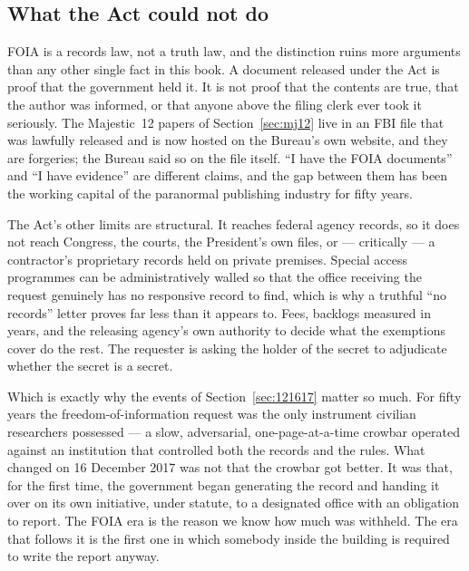 \Needspace*{0.40\textheight}
\subsection{What the Act could not do}\label{sec:foialimits}

FOIA is a records law, not a truth law, and the distinction ruins more arguments than any other single
fact in this book. A document released under the Act is proof that the government held it. It is not
proof that the contents are true, that the author was informed, or that anyone above the filing clerk
ever took it seriously. The Majestic~12 papers of Section~\ref{sec:mj12} live in an FBI file that was
lawfully released and is now hosted on the Bureau's own website, and they are forgeries; the Bureau
said so on the file itself. ``I have the FOIA documents'' and ``I have evidence'' are different
claims, and the gap between them has been the working capital of the paranormal publishing industry
for fifty years.

The Act's other limits are structural. It reaches federal agency records, so it does not reach
Congress, the courts, the President's own files, or --- critically --- a contractor's proprietary
records held on private premises. Special access programmes can be administratively walled so that
the office receiving the request genuinely has no responsive record to find, which is why a truthful
``no records'' letter proves far less than it appears to. Fees, backlogs measured in years, and the
releasing agency's own authority to decide what the exemptions cover do the rest. The requester is
asking the holder of the secret to adjudicate whether the secret is a secret.

Which is exactly why the events of Section~\ref{sec:121617} matter so much. For fifty years the
freedom-of-information request was the only instrument civilian researchers possessed --- a slow,
adversarial, one-page-at-a-time crowbar operated against an institution that controlled both the
records and the rules. What changed on 16 December 2017 was not that the crowbar got better. It was
that, for the first time, the government began generating the record and handing it over on its own
initiative, under statute, to a designated office with an obligation to report. The FOIA era is the
reason we know how much was withheld. The era that follows it is the first one in which somebody
inside the building is required to write the report anyway.

